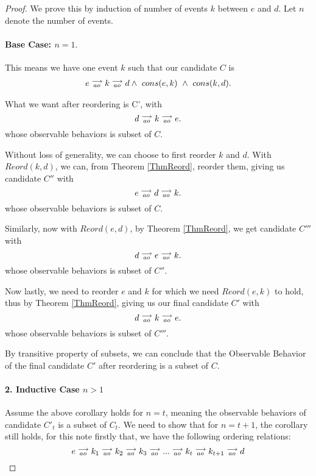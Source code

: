 \begin{proof}
    We prove this by induction of number of events $k$ between $e$ and $d$. Let $n$ denote the number of events.

    \paragraph{Base Case: $n = 1.$}
        This means we have one event $k$ such that our candidate $C$ is
        \begin{align*}
            \reln{e}{ao}{\reln{k}{ao}{d}} \wedge \ cons(e,k) \ \wedge \ cons(k,d).
        \end{align*}
                
        What we want after reordering is C', with
        \[
            d\stackrel{\longrightarrow}{_{ao}}k\stackrel{\longrightarrow}{_{ao}}e. 
        \]
        whose observable behaviors is subset of $C$.

        Without loss of generality, we can choose to first reorder $k$ and $d$. With $Reord(k,d)$, we can, from Theorem \ref{ThmReord}, reorder them, giving us candidate $C''$ with
        \[
            e\stackrel{\longrightarrow}{_{ao}}d\stackrel{\longrightarrow}{_{ao}}k. 
        \]
        whose observable behaviors is subset of $C$.

        Similarly, now with $Reord(e,d)$, by Theorem \ref{ThmReord}, we get candidate $C'''$ with 
        \[
            d\stackrel{\longrightarrow}{_{ao}}e\stackrel{\longrightarrow}{_{ao}}k. 
        \]
        whose observable behaviors is subset of $C''$.

        Now lastly, we need to reorder $e$ and $k$ for which we need $Reord(e,k)$ to hold, thus by Theorem \ref{ThmReord}, giving us our final candidate $C'$ with
        \[
            d\stackrel{\longrightarrow}{_{ao}}k\stackrel{\longrightarrow}{_{ao}}e.
        \]
        whose observable behaviors is subset of $C'''$.

        By transitive property of subsets, we can conclude that the Observable Behavior of the final candidate $C'$ after reordering is a subset of $C$.  

    \paragraph{2. Inductive Case $n > 1$}
        Assume the above corollary holds for $n = t$, meaning the observable behaviors of candidate $C'_t$ is a subset of $C_t$. 
        We need to show that for $n = t + 1$, the corollary still holds, for this note firstly that, we have the following ordering relations:    
        \[
            e\stackrel{\longrightarrow}{_{ao}}k_1\stackrel{\longrightarrow}{_{ao}}k_2\stackrel{\longrightarrow}{_{ao}}k_3\stackrel{\longrightarrow}{_{ao}}...\stackrel{\longrightarrow}{_{ao}}k_t\stackrel{\longrightarrow}{_{ao}}k_{t+1}\stackrel{\longrightarrow}{_{ao}}d  
        \]


\end{proof}
